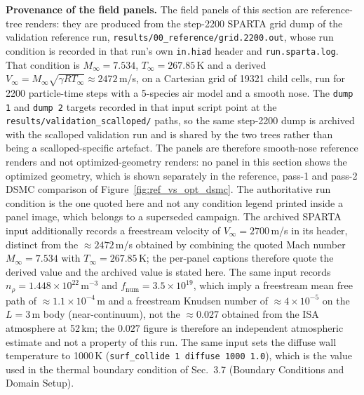 \textbf{Provenance of the field panels.}
The field panels of this section are reference-tree renders: they are produced from the step-2200 SPARTA grid dump of the validation reference run, \texttt{results/00\_reference/grid.2200.out}, whose run condition is recorded in that run's own \texttt{in.hiad} header and \texttt{run.sparta.log}. That condition is $M_{\infty} = 7.534$, $T_{\infty} = 267.85$\,K and a derived $V_{\infty} = M_{\infty}\sqrt{\gamma R T_{\infty}} \approx 2472$\,m/s, on a Cartesian grid of 19321 child cells, run for 2200 particle-time steps with a 5-species air model and a smooth nose. The \texttt{dump 1} and \texttt{dump 2} targets recorded in that input script point at the \texttt{results/validation\_scalloped/} paths, so the same step-2200 dump is archived with the scalloped validation run and is shared by the two trees rather than being a scalloped-specific artefact. The panels are therefore smooth-nose reference renders and not optimized-geometry renders: no panel in this section shows the optimized geometry, which is shown separately in the reference, pass-1 and pass-2 DSMC comparison of Figure~\ref{fig:ref_vs_opt_dsmc}. The authoritative run condition is the one quoted here and not any condition legend printed inside a panel image, which belongs to a superseded campaign. The archived SPARTA input additionally records a freestream velocity of $V_{\infty}=2700$\,m/s in its header, distinct from the $\approx2472$\,m/s obtained by combining the quoted Mach number $M_{\infty}=7.534$ with $T_{\infty}=267.85$\,K; the per-panel captions therefore quote the derived value and the archived value is stated here. The same input records $n_{\rho}=1.448\times10^{22}$\,m$^{-3}$ and $f_{\mathrm{num}}=3.5\times10^{19}$, which imply a freestream mean free path of $\approx1.1\times10^{-4}$\,m and a freestream Knudsen number of $\approx4\times10^{-5}$ on the $L=3$\,m body (near-continuum), not the $\approx0.027$ obtained from the ISA atmosphere at 52\,km; the $0.027$ figure is therefore an independent atmospheric estimate and not a property of this run. The same input sets the diffuse wall temperature to 1000\,K (\texttt{surf\_collide 1 diffuse 1000 1.0}), which is the value used in the thermal boundary condition of Sec.~3.7 (Boundary Conditions and Domain Setup).

